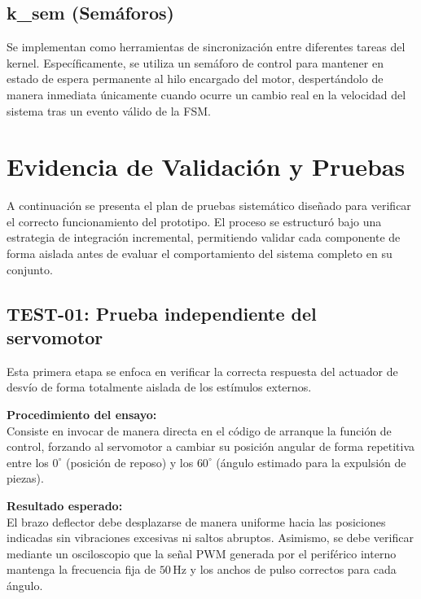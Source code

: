 \documentclass[12pt, letterpaper]{article}
\begin{document}
\subsection{k\_sem (Semáforos)}
Se implementan como herramientas de sincronización entre diferentes tareas del kernel. Específicamente, se utiliza un semáforo de control para mantener en estado de espera permanente al hilo encargado del motor, despertándolo de manera inmediata únicamente cuando ocurre un cambio real en la velocidad del sistema tras un evento válido de la FSM.

\section{Evidencia de Validación y Pruebas}
\label{sec:evidencia_validacion}

A continuación se presenta el plan de pruebas sistemático diseñado para verificar el correcto funcionamiento del prototipo. El proceso se estructuró bajo una estrategia de integración incremental, permitiendo validar cada componente de forma aislada antes de evaluar el comportamiento del sistema completo en su conjunto.

\subsection{TEST-01: Prueba independiente del servomotor}
Esta primera etapa se enfoca en verificar la correcta respuesta del actuador de desvío de forma totalmente aislada de los estímulos externos.

\vspace{0.5cm}

\noindent \textbf{Procedimiento del ensayo:} \\

Consiste en invocar de manera directa en el código de arranque la función de control, forzando al servomotor a cambiar su posición angular de forma repetitiva entre los $0^\circ$ (posición de reposo) y los $60^\circ$ (ángulo estimado para la expulsión de piezas).

\vspace{0.5cm}

\noindent \textbf{Resultado esperado:} \\

El brazo deflector debe desplazarse de manera uniforme hacia las posiciones indicadas sin vibraciones excesivas ni saltos abruptos. Asimismo, se debe verificar mediante un osciloscopio que la señal PWM generada por el periférico interno mantenga la frecuencia fija de $50\,$Hz y los anchos de pulso correctos para cada ángulo.
\end{document}
